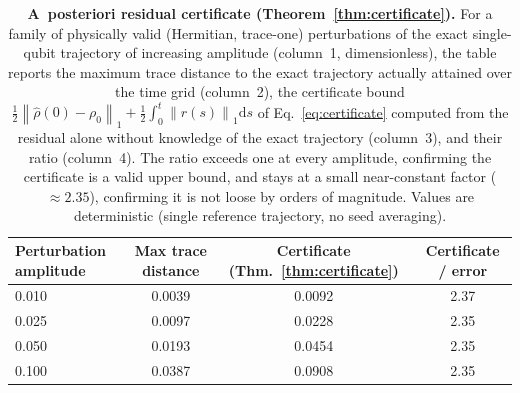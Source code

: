\documentclass[11pt]{article}
\newcommand{\dd}{\mathrm{d}}
\newcommand{\norm}[1]{\left\lVert #1 \right\rVert}
\newcommand{\rhohat}{\widehat{\rho}}
\begin{document}
\begin{table}[t]
\centering
\caption{\textbf{A~posteriori residual certificate (Theorem~\ref{thm:certificate}).} For a family of physically valid (Hermitian, trace-one) perturbations of the exact single-qubit trajectory of increasing amplitude (column~1, dimensionless), the table reports the maximum trace distance to the exact trajectory actually attained over the time grid (column~2), the certificate bound $\tfrac12\norm{\rhohat(0)-\rho_0}_1+\tfrac12\int_0^t\norm{r(s)}_1\dd s$ of Eq.~\eqref{eq:certificate} computed from the residual alone without knowledge of the exact trajectory (column~3), and their ratio (column~4). The ratio exceeds one at every amplitude, confirming the certificate is a valid upper bound, and stays at a small near-constant factor ($\approx2.35$), confirming it is not loose by orders of magnitude. Values are deterministic (single reference trajectory, no seed averaging).}
\label{tab:residual_certificate}
\begin{tabular}{lccc}
\toprule
Perturbation amplitude & Max trace distance & Certificate (Thm.~\ref{thm:certificate}) & Certificate / error \\
\midrule
0.010 & 0.0039 & 0.0092 & 2.37 \\
0.025 & 0.0097 & 0.0228 & 2.35 \\
0.050 & 0.0193 & 0.0454 & 2.35 \\
0.100 & 0.0387 & 0.0908 & 2.35 \\
\bottomrule
\end{tabular}
\end{table}
\end{document}
